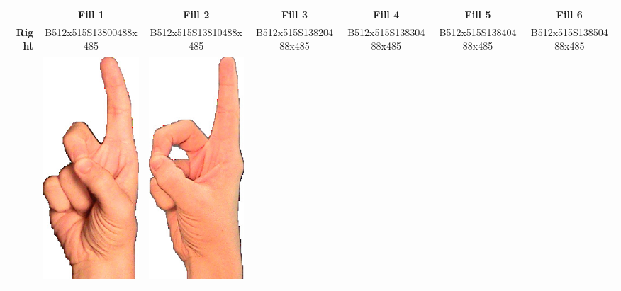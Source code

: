 \documentclass{article}
\begin{document}
\begin{center}
\begin{tabular}{r*{6}{c}}
&\textbf{Fill 1}&\textbf{Fill 2}&\textbf{Fill 3}&\textbf{Fill 4}&\textbf{Fill 5}&\textbf{Fill 6}\\
\multirow{2}{*}{\textbf{Right}}&
B512x515S13800488x485&
B512x515S13810488x485&
B512x515S13820488x485&
B512x515S13830488x485&
B512x515S13840488x485&
B512x515S13850488x485\\
&
\includegraphics[scale=0.1]{images/03-10-1.jpg}&
\includegraphics[scale=0.1]{images/03-10-2.jpg}&

\end{tabular}
\end{center}
\end{document}
